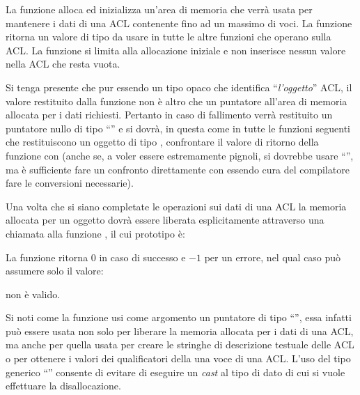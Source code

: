 La funzione alloca ed inizializza un'area di memoria che verrà usata per
mantenere i dati di una ACL contenente fino ad un massimo di 
voci. La funzione ritorna un valore di tipo  da usare in tutte le
altre funzioni che operano sulla ACL. La funzione si limita alla allocazione
iniziale e non inserisce nessun valore nella ACL che resta vuota. 

Si tenga presente che pur essendo  un tipo opaco che identifica
``\textsl{l'oggetto}'' ACL, il valore restituito dalla funzione non è altro
che un puntatore all'area di memoria allocata per i dati richiesti. Pertanto
in caso di fallimento verrà restituito un puntatore nullo di tipo
``'' e si dovrà, in questa come in tutte le funzioni
seguenti che restituiscono un oggetto di tipo , confrontare il
valore di ritorno della funzione con  (anche se, a voler essere
estremamente pignoli, si dovrebbe usare ``'', ma è
sufficiente fare un confronto direttamente con  essendo cura del
compilatore fare le conversioni necessarie).

Una volta che si siano completate le operazioni sui dati di una ACL la memoria
allocata per un oggetto  dovrà essere liberata esplicitamente
attraverso una chiamata alla funzione , il cui prototipo è:

\begin{funcproto}{
}

{La funzione ritorna $0$ in caso di successo e $-1$ per un errore, nel qual
  caso  può assumere solo il valore:
  \begin{errlist}
  \item[\errcode{EINVAL}]  non è valido.
  \end{errlist}
}
\end{funcproto}

Si noti come la funzione usi come argomento un puntatore di tipo ``'', essa infatti può essere usata non solo per liberare la memoria
allocata per i dati di una ACL, ma anche per quella usata per creare le
stringhe di descrizione testuale delle ACL o per ottenere i valori dei
qualificatori della una voce di una ACL. L'uso del tipo generico ``'' consente di evitare di eseguire un \textit{cast} al tipo di dato di cui
si vuole effettuare la disallocazione.

